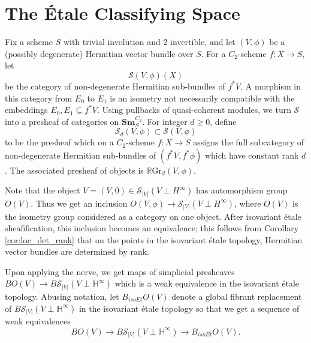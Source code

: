 \documentclass[edeposit,fullpage]{uiucthesis2009}
\newcommand{\mbb}{\mathbb}
\newcommand{\mc}{\mathcal}
\newcommand{\RGr}{\mathbb R\mathrm{Gr}}
\newcommand{\Sm}[1]{\mathbf{Sm}_{#1}}
\newcommand{\BigVB}[1]{\mathbf{BigVB}({#1})}
\DeclareMathOperator{\Hom}{Hom}
\DeclareMathOperator{\PreSm}{Pre_{Sm_S^{C_2}}}
\theoremstyle{plain}
\numberwithin{lemma}{section}
\theoremstyle{definition}
\begin{document}



\section{The \'Etale Classifying Space}

Fix a scheme $S$ with trivial involution and 2 invertible, and let $(V,\phi)$ be a
(possibly degenerate) Hermitian vector bundle over $S$. For a
$C_2$-scheme $f : X \rightarrow S$, let
\[
\mc S(V,\phi)(X)
\]
be the category of non-degenerate Hermitian sub-bundles of $f^*V$. A
morphism in this category from $E_0$ to $E_1$ is an isometry not
necessarily compatible with the embeddings $E_0,E_1 \subseteq
f^*V$. Using pullbacks of quasi-coherent modules, we turn $\mc S$ into a presheaf of categories on
$\Sm{S}^{C_2}$. For integer $d \geq 0$, define
\[
\mc S_d(V,\phi)  \subset \mc S(V,\phi)
\]
to be the presheaf which on a $C_2$-scheme $f : X \rightarrow S$
assigns the full subcategory of non-degenerate Hermitian sub-bundles
of $(f^*V,f^*\phi)$ which have constant rank $d$. The associated
presheaf of objects is $\RGr_d(V,\phi)$.

Note that the object $V = (V,0) \in \mc S_{|V|}(V \perp H^\infty)$ has
automorphism group $O(V)$. Thus we get an inclusion $O(V,\phi)
\rightarrow \mc S_{|V|}(V \perp H^\infty) $, where $O(V)$ is the
isometry group considered as a category on one object. After isovariant \'etale
sheafification, this inclusion becomes an equivalence; this follows
from Corollary \ref{cor:loc_det_rank} that on the points in the isovariant \'etale
topology, Hermitian vector bundles are determined by rank.

Upon applying the nerve, we get maps of simplicial presheaves $BO(V)
\rightarrow B\mc S_{|V|}(V\perp \mbb H^\infty)$ which is a weak
equivalence in the isovariant \'etale topology. Abusing notation, let $B_{isoEt}O(V)$
denote a global fibrant replacement of $B\mc S_{|V|}(V\perp \mbb H^\infty)$ in the isovariant
\'etale topology so that we get a sequence of weak equivalences
\[
BO(V) \rightarrow B\mc S_{|V|}(V\perp \mbb H^\infty) \rightarrow B_{isoEt}O(V).
\]
\end{document}
